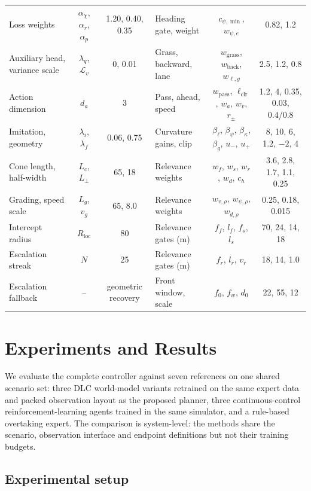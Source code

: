 \documentclass[journal]{IEEEtran}
\begin{document}
\begin{table}[!t]
\begin{tabular}{@{}lcc@{\hspace{16pt}}lcc@{}}
Loss weights & $\alpha_\chi$, $\alpha_r$, $\alpha_p$ & 1.20, 0.40, 0.35 & Heading gate, weight & $c_{\psi,\min}$, $w_{\psi,e}$ & 0.82, 1.2 \\
Auxiliary head, variance scale & $\lambda_q$, $\mathcal L_v$ & 0, 0.01 & Grass, backward, lane & $w_{\mathrm{grass}}$, $w_{\mathrm{back}}$, $w_{\ell,g}$ & 2.5, 1.2, 0.8 \\
Action dimension & $d_a$ & 3 & Pass, ahead, speed & $w_{\mathrm{pass}}$, $\ell_{\mathrm{clr}}$, $w_a$, $w_v$, $r_\pm$ & 1.2, 4, 0.35, 0.03, 0.4/0.8 \\
Imitation, geometry & $\lambda_i$, $\lambda_f$ & 0.06, 0.75 & Curvature gains, clip & $\beta_\ell$, $\beta_\psi$, $\beta_\kappa$, $\beta_g$, $u_-$, $u_+$ & 8, 10, 6, 1.2, $-2$, 4 \\
Cone length, half-width & $L_c$, $L_\perp$ & 65, 18 & Relevance weights & $w_f$, $w_s$, $w_r$, $w_d$, $c_h$ & 3.6, 2.8, 1.7, 1.1, 0.25 \\
Grading, speed scale & $L_g$, $v_g$ & 65, 8.0 & Relevance weights & $w_{v,\rho}$, $w_{\psi,\rho}$, $w_{d,\rho}$ & 0.25, 0.18, 0.015 \\
Intercept radius & $R_{\mathrm{loc}}$ & 80 & Relevance gates (m) & $f_f$, $l_f$, $f_s$, $l_s$ & 70, 24, 14, 18 \\
Escalation streak & $N$ & 25 & Relevance gates (m) & $f_r$, $l_r$, $v_r$ & 18, 14, 1.0 \\
Escalation fallback & -- & geometric recovery & Front window, scale & $f_0$, $f_w$, $d_0$ & 22, 55, 12 \\
\bottomrule
\end{tabular}
\end{table}

\section{Experiments and Results}
\label{sec:experiments}

We evaluate the complete controller against seven references on one shared
scenario set: three DLC world-model variants retrained on the same expert data
and packed observation layout as the proposed planner, three
continuous-control reinforcement-learning agents trained in the same simulator,
and a rule-based overtaking expert. The comparison is system-level: the methods
share the scenario, observation interface and endpoint definitions but not
their training budgets.

\subsection{Experimental setup}
\label{sec:setup}
\end{document}
